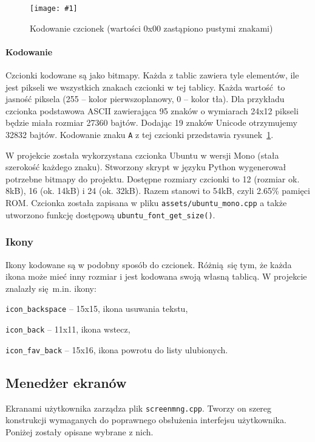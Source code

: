 \documentclass[12pt]{report}
\let\tempone\itemize
\let\temptwo\enditemize
\renewenvironment{itemize}{\tempone\setlength{\itemsep}{0cm}}{\temptwo}
\newcommand{\imgint}[4]{
	\begin{figure}[{#4}]
		\centering
		\texttt{[image: \#1]}
		\caption{#2}
		\label{#1}
	\end{figure}
}
\newcommand{\imgh}[3]{\imgint{#1}{#2}{#3}{H}}
\begin{document}
				\imgh{3/PicoRadio-screen-font}{Kodowanie czcionek (wartości 0x00 zastąpiono pustymi znakami)}{0.6}
				\paragraph{Kodowanie}
					Czcionki kodowane są jako bitmapy. Każda z tablic zawiera tyle elementów, ile jest pikseli we wszystkich znakach czcionki w tej tablicy. Każda wartość to jasność piksela (255 -- kolor pierwszoplanowy, 0 -- kolor tła). Dla przykładu czcionka podstawowa ASCII zawierająca 95 znaków o wymiarach 24x12 pikseli będzie miała rozmiar 27360 bajtów. Dodając 19 znaków Unicode otrzymujemy 32832 bajtów. Kodowanie znaku \lstinline|A| z tej czcionki przedstawia rysunek~\ref{3/PicoRadio-screen-font}.
				
				$ $\\
				W projekcie została wykorzystana czcionka Ubuntu\textsuperscript{\cite{ubuntu_font}} w wersji Mono (stała szerokość każdego znaku). Stworzony skrypt w języku Python wygenerował potrzebne bitmapy do projektu. Dostępne rozmiary czcionki to 12 (rozmiar ok. 8kB), 16 (ok. 14kB) i 24 (ok. 32kB). Razem stanowi to 54kB, czyli 2.65\% pamięci ROM. Czcionka została zapisana w pliku \lstinline|assets/ubuntu_mono.cpp| a także utworzono funkcję dostępową \lstinline|ubuntu_font_get_size()|. 
				
			\subsubsection{Ikony}
				Ikony kodowane są w podobny sposób do czcionek. Różnią się tym, że każda ikona może mieć inny rozmiar i jest kodowana swoją własną tablicą. W projekcie znalazły się m.in. ikony:
				\begin{itemize}
					\item \lstinline|icon_backspace| -- 15x15, ikona usuwania tekstu,
					\item \lstinline|icon_back| -- 11x11, ikona wstecz,
					\item \lstinline|icon_fav_back| -- 15x16, ikona powrotu do listy ulubionych.
				\end{itemize}
		
		\subsection{Menedżer ekranów}
			Ekranami użytkownika zarządza plik \lstinline|screenmng.cpp|. Tworzy on szereg konstrukcji wymaganych do poprawnego obsłużenia interfejsu użytkownika. Poniżej zostały opisane wybrane z nich.
			
\end{document}
